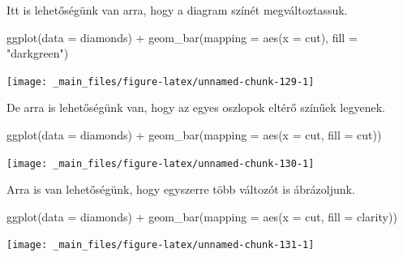 \documentclass[
]{book}
\newenvironment{Shaded}{\begin{snugshade}}{\end{snugshade}}
\newcommand{\AttributeTok}[1]{\textcolor[rgb]{0.77,0.63,0.00}{#1}}
\newcommand{\FunctionTok}[1]{\textcolor[rgb]{0.00,0.00,0.00}{#1}}
\newcommand{\NormalTok}[1]{#1}
\newcommand{\SpecialCharTok}[1]{\textcolor[rgb]{0.00,0.00,0.00}{#1}}
\newcommand{\StringTok}[1]{\textcolor[rgb]{0.31,0.60,0.02}{#1}}
\begin{document}
Itt is lehetőségünk van arra, hogy a diagram színét megváltoztassuk.

\begin{Shaded}
\begin{Highlighting}[]
\FunctionTok{ggplot}\NormalTok{(}\AttributeTok{data =}\NormalTok{ diamonds) }\SpecialCharTok{+}
  \FunctionTok{geom\_bar}\NormalTok{(}\AttributeTok{mapping =} \FunctionTok{aes}\NormalTok{(}\AttributeTok{x =}\NormalTok{ cut), }\AttributeTok{fill =} \StringTok{"darkgreen"}\NormalTok{)}
\end{Highlighting}
\end{Shaded}

\begin{center}\texttt{[image: \_main\_files/figure-latex/unnamed-chunk-129-1]} \end{center}

De arra is lehetőségünk van, hogy az egyes oszlopok eltérő színűek
legyenek.

\begin{Shaded}
\begin{Highlighting}[]
\FunctionTok{ggplot}\NormalTok{(}\AttributeTok{data =}\NormalTok{ diamonds) }\SpecialCharTok{+}
  \FunctionTok{geom\_bar}\NormalTok{(}\AttributeTok{mapping =} \FunctionTok{aes}\NormalTok{(}\AttributeTok{x =}\NormalTok{ cut, }\AttributeTok{fill =}\NormalTok{ cut))}
\end{Highlighting}
\end{Shaded}

\begin{center}\texttt{[image: \_main\_files/figure-latex/unnamed-chunk-130-1]} \end{center}

Arra is van lehetőségünk, hogy egyszerre több változót is ábrázoljunk.

\begin{Shaded}
\begin{Highlighting}[]
\FunctionTok{ggplot}\NormalTok{(}\AttributeTok{data =}\NormalTok{ diamonds) }\SpecialCharTok{+}
  \FunctionTok{geom\_bar}\NormalTok{(}\AttributeTok{mapping =} \FunctionTok{aes}\NormalTok{(}\AttributeTok{x =}\NormalTok{ cut, }\AttributeTok{fill =}\NormalTok{ clarity))}
\end{Highlighting}
\end{Shaded}

\begin{center}\texttt{[image: \_main\_files/figure-latex/unnamed-chunk-131-1]} \end{center}
\end{document}

